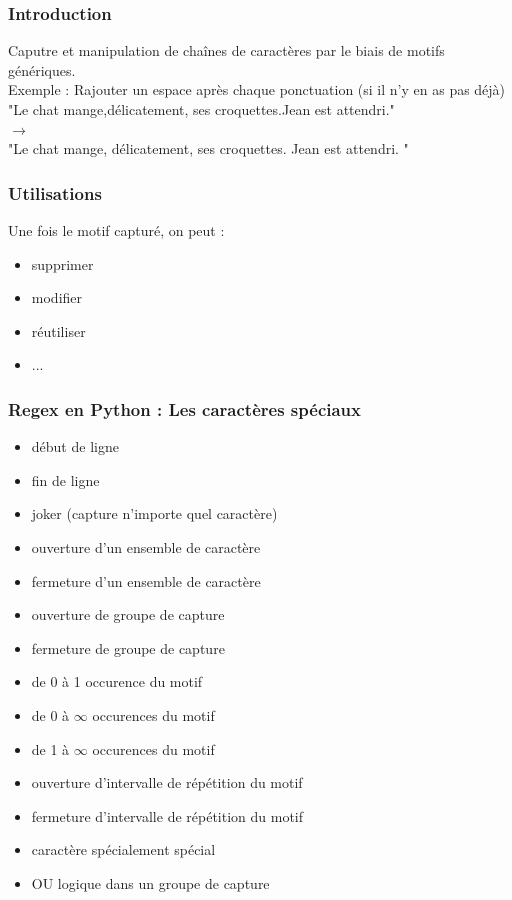 \begin{frame}
  \frametitle{Introduction}
  Caputre et manipulation de chaînes de caractères par le biais de motifs génériques. \\
  \newline
  Exemple : Rajouter un espace après chaque ponctuation (si il n'y en as pas déjà) \\
  \newline
  "Le chat mange,délicatement, ses croquettes.Jean est attendri." \\
  $\rightarrow$ \\
  "Le chat mange, délicatement, ses croquettes. Jean est attendri. " \\
\end{frame}

\begin{frame}
  \frametitle{Utilisations}
  Une fois le motif capturé, on peut :
  \begin{itemize}
  \item supprimer
  \item modifier
  \item réutiliser
  \item ...
  \end{itemize}
\end{frame}

\begin{frame}
  \frametitle{Regex en Python : Les caractères spéciaux}
  \begin{itemize}
  \item \makebox[1cm][c]{\^{}} début de ligne
  \item \makebox[1cm][c]{\$} fin de ligne
  \item {} joker (capture n'importe quel caractère) 
  \item \makebox[1cm][c]{[} ouverture d'un ensemble de caractère
  \item \makebox[1cm][c]{]} fermeture d'un ensemble de caractère
  \item \makebox[1cm][c]{(} ouverture de groupe de capture
  \item \makebox[1cm][c]{)} fermeture de groupe de capture
  \item {} de 0 à 1 occurence du motif
  \item \makebox[1cm][c]{*} de 0 à $\infty$ occurences du motif
  \item \makebox[1cm][c]{+} de 1 à $\infty$ occurences du motif
  \item \makebox[1cm][c]{\{} ouverture d'intervalle de répétition du motif
  \item \makebox[1cm][c]{\}} fermeture d'intervalle de répétition du motif
  \item \makebox[1cm][c]{\textbackslash} caractère spécialement spécial
  \item \makebox[1cm][c]{\textbar} OU logique dans un groupe de capture
  \end{itemize}
\end{frame}

